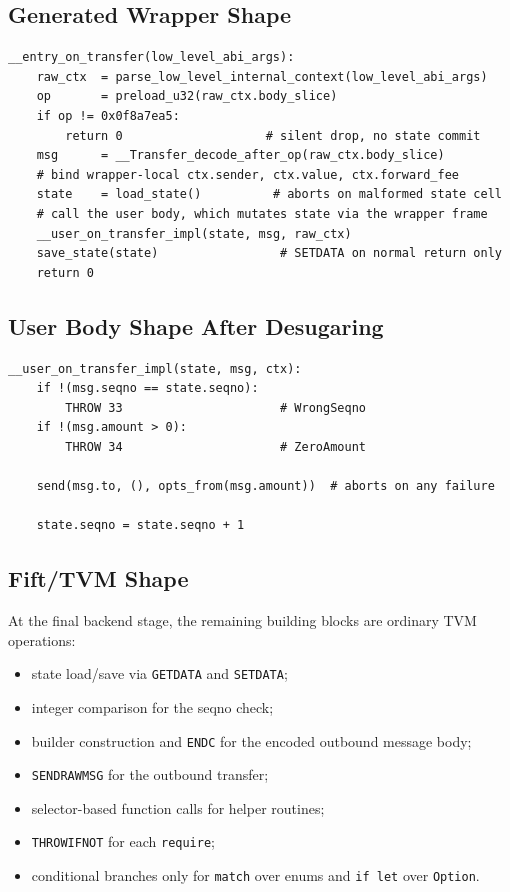\documentclass[12pt,oneside]{article}
\begin{document}
\subsection{Generated Wrapper Shape}
\begin{verbatim}
__entry_on_transfer(low_level_abi_args):
    raw_ctx  = parse_low_level_internal_context(low_level_abi_args)
    op       = preload_u32(raw_ctx.body_slice)
    if op != 0x0f8a7ea5:
        return 0                    # silent drop, no state commit
    msg      = __Transfer_decode_after_op(raw_ctx.body_slice)
    # bind wrapper-local ctx.sender, ctx.value, ctx.forward_fee
    state    = load_state()          # aborts on malformed state cell
    # call the user body, which mutates state via the wrapper frame
    __user_on_transfer_impl(state, msg, raw_ctx)
    save_state(state)                 # SETDATA on normal return only
    return 0
\end{verbatim}

\subsection{User Body Shape After Desugaring}
\begin{verbatim}
__user_on_transfer_impl(state, msg, ctx):
    if !(msg.seqno == state.seqno):
        THROW 33                      # WrongSeqno
    if !(msg.amount > 0):
        THROW 34                      # ZeroAmount

    send(msg.to, (), opts_from(msg.amount))  # aborts on any failure

    state.seqno = state.seqno + 1
\end{verbatim}

\subsection{Fift/TVM Shape}
At the final backend stage, the remaining building blocks are
ordinary TVM operations:

\begin{itemize}
\item state load/save via \verb|GETDATA| and \verb|SETDATA|;
\item integer comparison for the seqno check;
\item builder construction and \verb|ENDC| for the encoded outbound
message body;
\item \verb|SENDRAWMSG| for the outbound transfer;
\item selector-based function calls for helper routines;
\item \verb|THROWIFNOT| for each \verb|require|;
\item conditional branches only for \verb|match| over enums and
\verb|if let| over \verb|Option|.
\end{itemize}
\end{document}
